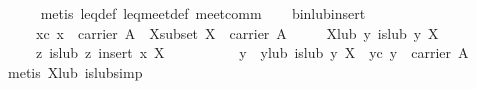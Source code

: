 \begin{isabellebody}
%
\isadelimproof
\ \ \ \ %
\endisadelimproof
%
\isatagproof
{}\isamarkupfalse%
\ {}metis\ leq{}def\ leq{}meet{}def\ meet{}comm{}%
\endisatagproof
{\isafoldproof}%
%
\isadelimproof
\isanewline
%
\endisadelimproof
\isanewline
\ \ \isamarkupfalse%
\ bin{}lub{}insert{}\isanewline
\ \ \ \ \ xc{}\ {}x\ {}\ carrier\ A{}\ \ X{}subset{}\ {}X\ {}\ carrier\ A{}\isanewline
\ \ \ \ \ X{}lub{}\ {}{}y{}\ is{}lub\ y\ X{}\isanewline
\ \ \ \ \ {}{}z{}\ is{}lub\ z\ {}insert\ x\ X{}{}\isanewline
%
\isadelimproof
\ \ %
\endisadelimproof
%
\isatagproof
{}\isamarkupfalse%
\ {}\isanewline
\ \ \ \ \isamarkupfalse%
\ y\ \ y{}lub{}\ {}is{}lub\ y\ X{}\ \ yc{}\ {}y\ {}\ carrier\ A{}\ \isamarkupfalse%
\ {}metis\ X{}lub\ is{}lub{}simp{}\isanewline

\end{isabellebody}
